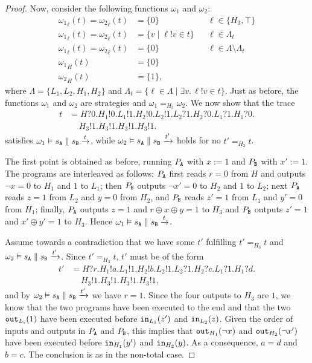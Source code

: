 \documentclass[preprint,5p,twocolumn]{elsarticle}
\begin{document}
\begin{proof}
  Now, consider the following functions $\omega_1$ and $\omega_2$:
  \begin{align*}
    {\omega_1}_{\ell}(t) = {\omega_2}_{\ell}(t) &= \{0\} && \ell \in \{H_3, \top\}\\
    {\omega_1}_{\ell}(t) = {\omega_2}_{\ell}(t) &= \lbrace v \mid \ell ! v \in t \rbrace && \ell \in \Lambda_t\\
    {\omega_1}_{\ell}(t) = {\omega_2}_{\ell}(t) &= \{0\} && \ell \in \Lambda \setminus \Lambda_t\\
    {\omega_1}_H(t) &= \{0\} \\
    {\omega_2}_H(t) &= \{1\},
  \end{align*}
  where $\Lambda = \{L_1,L_2,H_1,H_2\}$ and
  $\Lambda_t = \{\ell \in \Lambda \mid \exists v.\,\ell!v \in t\}$.
  Just as before, the functions $\omega_1$ and $\omega_2$ are strategies and $\omega_1 =_{H_3} \omega_2$. We now show that the trace
  \begin{align*}
    t &= H?0.H_1!0.L_1!1.H_2!0.L_2!1.L_2?1.H_2?0.L_1?1.H_1?0.\\
      &\quad\,H_3!1.H_3!1.H_3!1.H_3!1.
  \end{align*}
  satisfies $\omega_1 \vDash s_{\mathtt{A}} \parallel s_{\mathtt{B}} \xrightarrow{t}$, while
  $\omega_2 \vDash s_{\mathtt{A}} \parallel s_{\mathtt{B}} \xrightarrow{t'}$ holds for no $t' =_{H_3} t$.

  The first point is obtained as before, running $P_{\mathtt{A}}$ with $x := 1$ and $P_{\mathtt{B}}$ with $x' := 1$.
  The programs are interleaved as follows: $P_{\mathtt{A}}$ first reads $r=0$ from $H$ and outputs $\neg x=0$
  to $H_1$ and $1$ to $L_1$; then $P_{\mathtt{B}}$ outputs $\neg x'=0$ to $H_2$ and $1$ to $L_2$; next
  $P_{\mathtt{A}}$ reads $z=1$ from $L_2$ and $y=0$ from $H_2$,
  and $P_{\mathtt{B}}$ reads $z'=1$ from $L_1$ and $y'=0$ from $H_1$;
  finally, $P_{\mathtt{A}}$ outputs $z=1$ and $r \oplus x \oplus y=1$ to $H_3$ and $P_{\mathtt{B}}$ outputs $z'=1$
  and $x' \oplus y'=1$ to $H_3$. Hence $\omega_1 \vDash s_{\mathtt{A}} \parallel s_{\mathtt{B}} \xrightarrow{t}$.

  Assume towards a contradiction that we have some $t'$ fulfilling $t' =_{H_3} t$
  and $\omega_2 \vDash s_{\mathtt{A}} \parallel s_{\mathtt{B}} \xrightarrow{t'}$. Since $t' =_{H_3} t$, $t'$ must
  be of the form
  \begin{align*}
    t' &= H?r.H_1!a.L_1!1.H_2!b.L_2!1.L_2?1.H_2?c.L_1?1.H_1?d.\\
      &\quad\,H_3!1.H_3!1.H_3!1.H_3!1,
  \end{align*}
  and by $\omega_2 \vDash s_{\mathtt{A}} \parallel s_{\mathtt{B}} \xrightarrow{t'}$ we have $r=1$.
  Since the four outputs to $H_3$ are $1$, we know that the two programs have been executed
  to the end and that the two $\mathtt{out}_{L_i}(1)$ have been executed before 
  $\mathtt{in}_{L_1}(z')$ and $\mathtt{in}_{L_2}(z)$. Given the order of inputs and outputs in $P_{\mathtt{A}}$ and $P_{\mathtt{B}}$,
  this implies that $\mathtt{out}_{H_1}(\neg x)$ and $\mathtt{out}_{H_2}(\neg x')$ have been executed
  before $\mathtt{in}_{H_1}(y')$ and $\mathtt{in}_{H_2}(y)$. As a consequence, $a=d$ and $b=c$. The conclusion
  is as in the non-total case.  
\end{proof}
\end{document}
